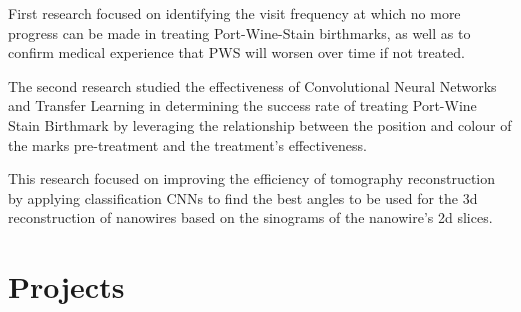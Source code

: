 \documentclass[]{CV}
\begin{document}
\begin{minipage}[t]{0.705\textwidth}
\begin{tightemize}
\quad
\end{tightemize}

\vspace{\topsep}
\begin{tightemize}

\item First research focused on identifying the visit frequency at which no more progress can be made in treating Port-Wine-Stain birthmarks, as well as to confirm medical experience that PWS will worsen over time if not treated.

\item The second research studied the effectiveness of Convolutional Neural Networks and Transfer Learning in determining the success rate of treating Port-Wine Stain Birthmark by leveraging the relationship between the position and colour of the marks pre-treatment and the treatment's effectiveness.


\end{tightemize}
\sectionsep

\vspace{\topsep} %
\begin{tightemize}
\item This research focused on improving the efficiency of tomography reconstruction by applying classification CNNs to find the best angles to be used for the 3d reconstruction of nanowires based on the sinograms of the nanowire's 2d slices.


\end{tightemize}



\section{Projects}
\begin{tightemize}


\end{tightemize}
\end{minipage}
\end{document}
